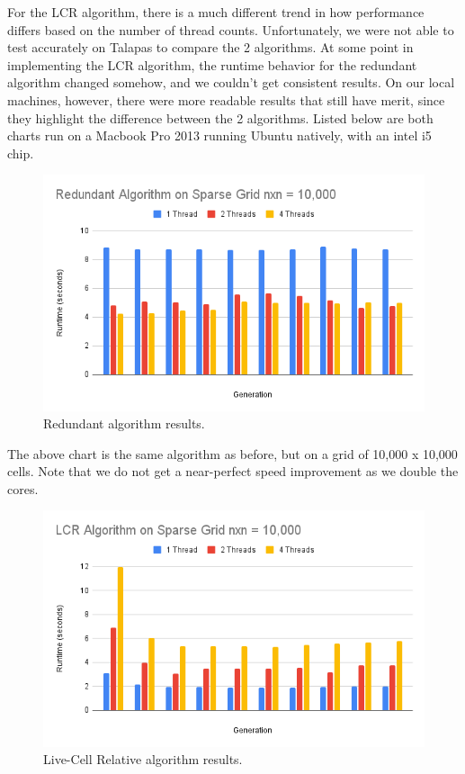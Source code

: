\documentclass[12pt]{article}
\begin{document}
For the LCR algorithm, there is a much different trend in how performance differs based on the number of thread counts. Unfortunately, we were not able to test accurately on Talapas to compare the 2 algorithms. At some point in implementing the LCR algorithm, the runtime behavior for the redundant algorithm changed somehow, and we couldn't get consistent results. On our local machines, however, there were more readable results that still have merit, since they highlight the difference between the 2 algorithms. Listed below are both charts run on a Macbook Pro 2013 running Ubuntu natively, with an intel i5 chip.

\begin{figure}[ht]
\centering
\includegraphics[width=\linewidth]{redundant_10000.PNG}
\caption{\label{fig:chart_2}Redundant algorithm results.}
\end{figure}

The above chart is the same algorithm as before, but on a grid of 10,000 x 10,000 cells. Note that we do not get a near-perfect speed improvement as we double the cores. 

\begin{figure}[!ht]
\centering
\includegraphics[width=\linewidth]{lcr_10000.PNG}
\caption{\label{fig:chart_3}Live-Cell Relative algorithm results.}
\end{figure}
\end{document}
